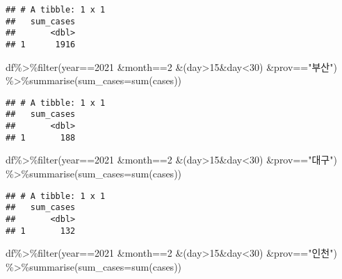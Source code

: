 \documentclass[
]{article}
\newenvironment{Shaded}{\begin{snugshade}}{\end{snugshade}}
\newcommand{\AttributeTok}[1]{\textcolor[rgb]{0.77,0.63,0.00}{#1}}
\newcommand{\DecValTok}[1]{\textcolor[rgb]{0.00,0.00,0.81}{#1}}
\newcommand{\FunctionTok}[1]{\textcolor[rgb]{0.00,0.00,0.00}{#1}}
\newcommand{\NormalTok}[1]{#1}
\newcommand{\SpecialCharTok}[1]{\textcolor[rgb]{0.00,0.00,0.00}{#1}}
\newcommand{\StringTok}[1]{\textcolor[rgb]{0.31,0.60,0.02}{#1}}
\begin{document}
\begin{verbatim}
## # A tibble: 1 x 1
##   sum_cases
##       <dbl>
## 1      1916
\end{verbatim}

\begin{Shaded}
\begin{Highlighting}[]
\NormalTok{df}\SpecialCharTok{\%\textgreater{}\%}\FunctionTok{filter}\NormalTok{(year}\SpecialCharTok{==}\DecValTok{2021} \SpecialCharTok{\&}\NormalTok{month}\SpecialCharTok{==}\DecValTok{2} \SpecialCharTok{\&}\NormalTok{(day}\SpecialCharTok{\textgreater{}}\DecValTok{15}\SpecialCharTok{\&}\NormalTok{day}\SpecialCharTok{\textless{}}\DecValTok{30}\NormalTok{) }\SpecialCharTok{\&}\NormalTok{prov}\SpecialCharTok{==}\StringTok{"부산"}\NormalTok{) }\SpecialCharTok{\%\textgreater{}\%}\FunctionTok{summarise}\NormalTok{(}\AttributeTok{sum\_cases=}\FunctionTok{sum}\NormalTok{(cases))}
\end{Highlighting}
\end{Shaded}

\begin{verbatim}
## # A tibble: 1 x 1
##   sum_cases
##       <dbl>
## 1       188
\end{verbatim}

\begin{Shaded}
\begin{Highlighting}[]
\NormalTok{df}\SpecialCharTok{\%\textgreater{}\%}\FunctionTok{filter}\NormalTok{(year}\SpecialCharTok{==}\DecValTok{2021} \SpecialCharTok{\&}\NormalTok{month}\SpecialCharTok{==}\DecValTok{2} \SpecialCharTok{\&}\NormalTok{(day}\SpecialCharTok{\textgreater{}}\DecValTok{15}\SpecialCharTok{\&}\NormalTok{day}\SpecialCharTok{\textless{}}\DecValTok{30}\NormalTok{) }\SpecialCharTok{\&}\NormalTok{prov}\SpecialCharTok{==}\StringTok{"대구"}\NormalTok{) }\SpecialCharTok{\%\textgreater{}\%}\FunctionTok{summarise}\NormalTok{(}\AttributeTok{sum\_cases=}\FunctionTok{sum}\NormalTok{(cases))}
\end{Highlighting}
\end{Shaded}

\begin{verbatim}
## # A tibble: 1 x 1
##   sum_cases
##       <dbl>
## 1       132
\end{verbatim}

\begin{Shaded}
\begin{Highlighting}[]
\NormalTok{df}\SpecialCharTok{\%\textgreater{}\%}\FunctionTok{filter}\NormalTok{(year}\SpecialCharTok{==}\DecValTok{2021} \SpecialCharTok{\&}\NormalTok{month}\SpecialCharTok{==}\DecValTok{2} \SpecialCharTok{\&}\NormalTok{(day}\SpecialCharTok{\textgreater{}}\DecValTok{15}\SpecialCharTok{\&}\NormalTok{day}\SpecialCharTok{\textless{}}\DecValTok{30}\NormalTok{) }\SpecialCharTok{\&}\NormalTok{prov}\SpecialCharTok{==}\StringTok{"인천"}\NormalTok{) }\SpecialCharTok{\%\textgreater{}\%}\FunctionTok{summarise}\NormalTok{(}\AttributeTok{sum\_cases=}\FunctionTok{sum}\NormalTok{(cases))}
\end{Highlighting}
\end{Shaded}
\end{document}
